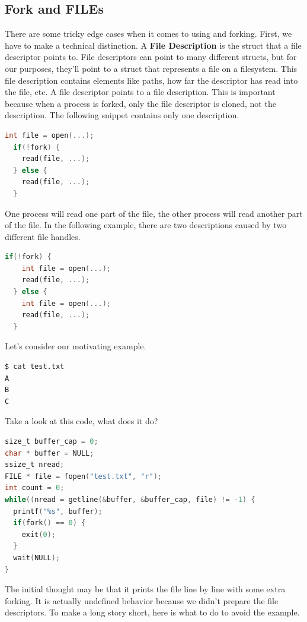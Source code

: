 \subsection{Fork and FILEs}

There are some tricky edge cases when it comes to using  and forking.
First, we have to make a technical distinction.
A \textbf{File Description} is the struct that a file descriptor points to.
File descriptors can point to many different structs, but for our purposes, they'll point to a struct that represents a file on a filesystem.
This file description contains elements like paths, how far the descriptor has read into the file, etc.
A file descriptor points to a file description.
This is important because when a process is forked, only the file descriptor is cloned, not the description.
The following snippet contains only one description.

\begin{lstlisting}[language=C]
  int file = open(...);
  if(!fork) {
    read(file, ...);
  } else {
    read(file, ...);
  }
\end{lstlisting}

One process will read one part of the file, the other process will read another part of the file.
In the following example, there are two descriptions caused by two different file handles.

\begin{lstlisting}[language=C]
  if(!fork) {
    int file = open(...);
    read(file, ...);
  } else {
    int file = open(...);
    read(file, ...);
  }
\end{lstlisting}

Let's consider our motivating example.

\begin{lstlisting}[language=bash]
$ cat test.txt
A
B
C
\end{lstlisting}

Take a look at this code, what does it do?

\begin{lstlisting}[language=C]
size_t buffer_cap = 0;
char * buffer = NULL;
ssize_t nread;
FILE * file = fopen("test.txt", "r");
int count = 0;
while((nread = getline(&buffer, &buffer_cap, file) != -1) {
  printf("%s", buffer);
  if(fork() == 0) { 
    exit(0);
  }
  wait(NULL);
}
\end{lstlisting}

The initial thought may be that it prints the file line by line with some extra forking.
It is actually undefined behavior because we didn't prepare the file descriptors.
To make a long story short, here is what to do to avoid the example.

